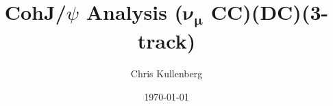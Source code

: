 \title{CohJ/$\psi$ Analysis ($\boldsymbol{\nu_\mu}$ \textbf{CC})(\textbf{DC})(\textbf{3-track})}
\author{Chris Kullenberg}
\date{\today}
